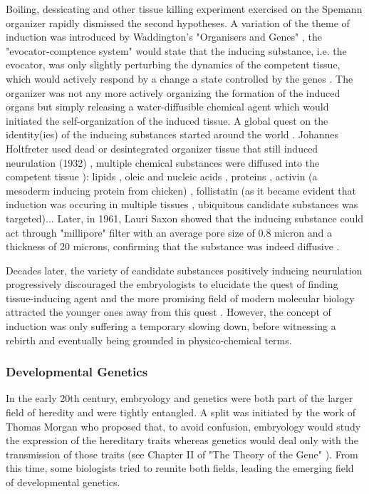   Boiling, dessicating and other tissue killing experiment exercised on the Spemann organizer rapidly dismissed the second hypotheses. A variation of the theme of induction was introduced by Waddington's "Organisers and Genes" \cite{Waddington:1940tj}, the "evocator-comptence system" would state that the inducing substance, i.e. the evocator, was only slightly perturbing the dynamics of the competent tissue, which would actively respond by a change a state controlled by the genes \cite{Gilbert:1991ww}. The organizer was not any more actively organizing the formation of the induced organs but simply releasing a water-diffusible chemical agent which would initiated the self-organization of the induced tissue. A global quest on the identity(ies) of the inducing substances started around the world . Johannes Holtfreter used dead or desintegrated organizer tissue that still induced neurulation (1932) \cite{Gerhart:1998wy}, multiple chemical substances were diffused into the competent tissue \cite{Steinbeisser:1996vs}): lipids \cite{Needham:1934ux}, oleic and nucleic acids \cite{Wehmeier:1934wh}, proteins \cite{Barth:1938fx}, activin (a mesoderm inducing protein from chicken) \cite{Tiedemann:1992te}, follistatin (as it became evident that induction was occuring in multiple tissues \cite{Kessler:1994un}, ubiquitous candidate substances was targeted)... Later, in 1961, Lauri Saxon showed that the inducing substance could act through "millipore" filter with an average pore size of 0.8 micron and a thickness of 20 microns, confirming that the substance was indeed diffusive \cite{Saxen:1961uk}. 

  Decades later, the variety of candidate substances positively inducing neurulation progressively discouraged the embryologists to elucidate the quest of finding tissue-inducing agent and the more promising field of modern molecular biology attracted the younger ones away from this quest \cite{Holtfreter:1991wi}. However, the concept of induction was only suffering a temporary slowing down, before witnessing a rebirth and eventually being grounded in physico-chemical terms. 


\subsubsection{Developmental Genetics}


  In the early 20th century, embryology and genetics were both part of the larger field of heredity and were tightly entangled. A split was initiated by the work of Thomas Morgan who proposed that, to avoid confusion, embryology would study the expression of the hereditary traits whereas genetics would deal only with the transmission of those traits (see Chapter II of "The Theory of the Gene" \cite{Morgan:1926wt}). From this time, some biologists tried to reunite both fields, leading the emerging field of developmental genetics.  

